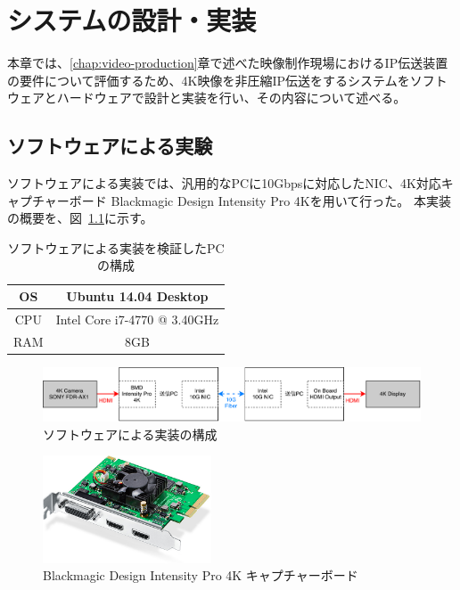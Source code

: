 \chapter{システムの設計・実装}
\label{chap:implementation}

本章では、\ref{chap:video-production}章で述べた映像制作現場におけるIP伝送装置の要件について評価するため、4K映像を非圧縮IP伝送をするシステムをソフトウェアとハードウェアで設計と実装を行い、その内容について述べる。

\section{ソフトウェアによる実験}
\label{chap:implementation}

ソフトウェアによる実装では、汎用的なPCに10Gbpsに対応したNIC、4K対応キャプチャーボード Blackmagic Design Intensity Pro 4Kを用いて行った。
本実装の概要を、図~\ref{fig:software-implement-flow}に示す。

\begin{table}[htbp]
  \caption{ソフトウェアによる実装を検証したPCの構成}
  \label{tb:software-specification}
  \begin{center}
  \begin{tabular}{c||c}
    \hline
    OS  & Ubuntu 14.04 Desktop \\\hline
    CPU & Intel Core i7-4770 @ 3.40GHz \\\hline
    RAM & 8GB                  \\\hline
  \end{tabular}\end{center}
\end{table}

\begin{figure}[htbp]
  \begin{center}
    \includegraphics[bb=0 0 841 121,width=15.5cm]{img/software-implement-flow.pdf}
  \end{center}
  \caption{ソフトウェアによる実装の構成}
  \label{fig:software-implement-flow}
\end{figure}

\begin{figure}[htbp]
  \begin{center}
    \includegraphics[bb=0 0 644 410,width=5cm]{img/bmd-intensity-pro-4k.jpg}
  \end{center}
  \caption{Blackmagic Design Intensity Pro 4K キャプチャーボード}
  \label{fig:ted-4k-fmc-card}
\end{figure}

